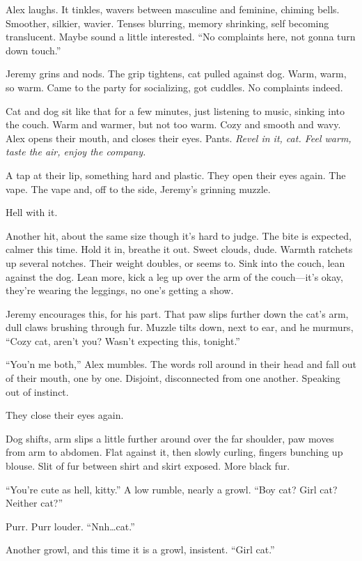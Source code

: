 Alex laughs. It tinkles, wavers between masculine and feminine, chiming bells. Smoother, silkier, wavier. Tenses blurring, memory shrinking, self becoming translucent. Maybe sound a little interested. ``No complaints here, not gonna turn down touch.''

Jeremy grins and nods. The grip tightens, cat pulled against dog. Warm, warm, so warm. Came to the party for socializing, got cuddles. No complaints indeed.

Cat and dog sit like that for a few minutes, just listening to music, sinking into the couch. Warm and warmer, but not too warm. Cozy and smooth and wavy. Alex opens their mouth, and closes their eyes. Pants. \emph{Revel in it, cat. Feel warm, taste the air, enjoy the company.}

A tap at their lip, something hard and plastic. They open their eyes again. The vape. The vape and, off to the side, Jeremy's grinning muzzle.

Hell with it.

Another hit, about the same size though it's hard to judge. The bite is expected, calmer this time. Hold it in, breathe it out. Sweet clouds, dude. Warmth ratchets up several notches. Their weight doubles, or seems to. Sink into the couch, lean against the dog. Lean more, kick a leg up over the arm of the couch---it's okay, they're wearing the leggings, no one's getting a show.

Jeremy encourages this, for his part. That paw slips further down the cat's arm, dull claws brushing through fur. Muzzle tilts down, next to ear, and he murmurs, ``Cozy cat, aren't you? Wasn't expecting this, tonight.''

``You'n me both,'' Alex mumbles. The words roll around in their head and fall out of their mouth, one by one. Disjoint, disconnected from one another. Speaking out of instinct.

They close their eyes again.

Dog shifts, arm slips a little further around over the far shoulder, paw moves from arm to abdomen. Flat against it, then slowly curling, fingers bunching up blouse. Slit of fur between shirt and skirt exposed. More black fur.

``You're cute as hell, kitty.'' A low rumble, nearly a growl. ``Boy cat? Girl cat? Neither cat?''

Purr. Purr louder. ``Nnh\ldots{}cat.''

Another growl, and this time it is a growl, insistent. ``Girl cat.''

